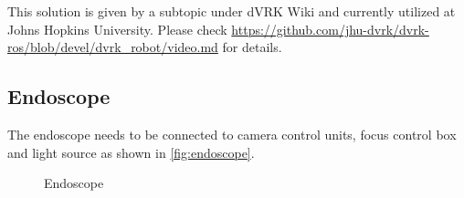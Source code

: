 This solution is given by a subtopic under dVRK Wiki and currently utilized at Johns Hopkins University. Please check \url{https://github.com/jhu-dvrk/dvrk-ros/blob/devel/dvrk_robot/video.md} for details.

\subsection{Endoscope}

The endoscope needs to be connected to camera control units, focus control box and light source as shown in \autoref{fig:endoscope}. 

\begin{figure}[H]
\centering
{}
\hfil
{}
\caption{Endoscope}
\label{fig:endoscope}
\end{figure}

